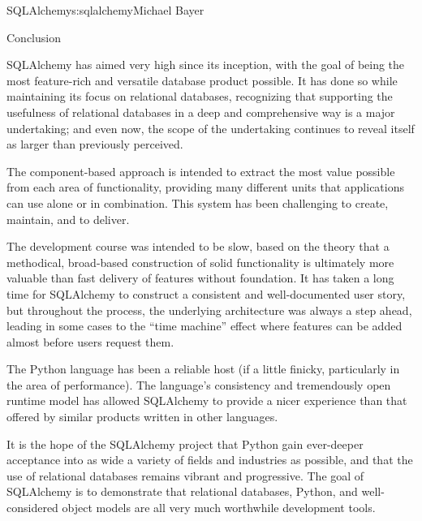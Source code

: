 \begin{aosachapter}{SQLAlchemy}{s:sqlalchemy}{Michael Bayer}
\begin{aosasect1}{Conclusion}

SQLAlchemy has aimed very high since its inception, with the goal of being
the most feature-rich and versatile database product possible.  It has done
so while maintaining its focus on relational databases, recognizing that
supporting the usefulness of relational databases in a deep and comprehensive way
is a major undertaking; and even now, the scope of the undertaking
continues to reveal itself as larger than previously perceived.

The component-based
approach is intended to extract the most value possible from each area
of functionality, providing many different units that applications can use alone
or in combination.  This system has been challenging to create, maintain,
and to deliver.

The development course was intended to be slow, based on the
theory that a methodical, broad-based construction of solid functionality is ultimately more valuable
than fast delivery of features without foundation.  It has taken a long time for SQLAlchemy to
construct
a consistent and well-documented user story, but throughout the process, the underlying architecture
was always a step ahead, leading in some cases to the ``time machine'' effect
where features can be added almost before users request them.

The Python language has been a reliable host (if
a little finicky, particularly in the area of performance).  The language's
consistency and tremendously open runtime model has allowed SQLAlchemy to provide a nicer
experience than that offered by similar products written in other languages.

It is the hope of the SQLAlchemy project that Python gain ever-deeper
acceptance into as wide a variety of fields and industries as possible, and
that the use of relational databases remains vibrant and progressive. The goal
of SQLAlchemy is to demonstrate that relational databases, Python, and
well-considered object models are all very much worthwhile development tools.

\end{aosasect1}

\end{aosachapter}
